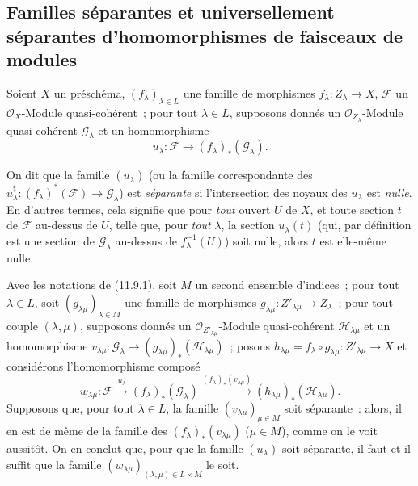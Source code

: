 \subsection{Familles séparantes et universellement séparantes d'homomorphismes
de faisceaux de modules}
\label{subsection:IV.11.9-fr}

\begin{env}[11.9.1]
\label{IV.11.9.1-fr}
Soient $X$ un préschéma, $(f_{\lambda})_{\lambda\in L}$ une famille de morphismes
$f_{\lambda}:Z_{\lambda}\to X$, $\mathcal F$ un $\mathcal O_X$-Module
quasi-cohérent~; pour tout $\lambda\in L$, supposons donnés un
$\mathcal O_{Z_{\lambda}}$-Module quasi-cohérent $\mathcal G_{\lambda}$ et un
homomorphisme
\begin{equation}
u_{\lambda}:\mathcal F\longrightarrow(f_{\lambda})_*(\mathcal G_{\lambda}).
\label{IV.11.9.1.1-fr}
\tag{11.9.1.1}
\end{equation}
\end{env}


On dit que la famille $(u_\lambda)$ (ou la famille correspondante des
$u^\sharp_\lambda:(f_\lambda)^*(\mathcal F)\to\mathcal G_\lambda$) est
\emph{séparante} si l'intersection des noyaux des $u_\lambda$ est
\emph{nulle}. En d'autres termes, cela signifie que pour \emph{tout} ouvert
$U$ de $X$, et toute section $t$ de $\mathcal F$ au-dessus de $U$, telle que,
pour \emph{tout} $\lambda$, la section $u_\lambda(t)$ (qui, par définition est
une section de $\mathcal G_\lambda$ au-dessus de $f_\lambda^{-1}(U)$) soit
nulle, alors $t$ est elle-même nulle.

\begin{env}[11.9.2]
\label{IV.11.9.2-fr}
Avec les notations de (11.9.1), soit $M$ un second ensemble d'indices~; pour
tout $\lambda\in L$, soit $(g_{\lambda\mu})_{\lambda\in M}$ une famille de
morphismes $g_{\lambda\mu}:Z'_{\lambda\mu}\to Z_\lambda$~; pour tout couple
$(\lambda,\mu)$, supposons donnés un $\mathcal O_{Z'_{\lambda\mu}}$-Module
quasi-cohérent $\mathcal H_{\lambda\mu}$ et un homomorphisme
$v_{\lambda\mu}:\mathcal G_\lambda\to
(g_{\lambda\mu})_*(\mathcal H_{\lambda\mu})$~; posons
$h_{\lambda\mu}=f_\lambda\circ g_{\lambda\mu}:Z'_{\lambda\mu}\to X$ et
considérons l'homomorphisme composé
\[
w_{\lambda\mu}:\mathcal F\xrightarrow{u_\lambda}
(f_\lambda)_*(\mathcal G_\lambda)
\xrightarrow{(f_\lambda)_*(v_{\lambda\mu})}
(h_{\lambda\mu})_*(\mathcal H_{\lambda\mu}).
\]
Supposons que, pour tout $\lambda\in L$, la famille
$(v_{\lambda\mu})_{\mu\in M}$ soit séparante~: alors, il en est de même de la
famille des $(f_\lambda)_*(v_{\lambda\mu})$ ($\mu\in M$), comme on le voit
aussitôt. On en conclut que, pour que la famille $(u_\lambda)$ soit séparante,
il faut et il suffit que la famille
$(w_{\lambda\mu})_{(\lambda,\mu)\in L\times M}$ le soit.
\end{env}

